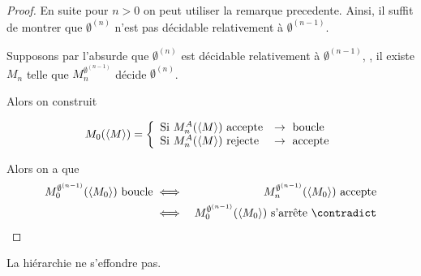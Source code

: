 \begin{proof}
	En suite pour $n > 0$ on peut utiliser la remarque precedente. Ainsi, il suffit de montrer que $\emptyset^{(n)}$ n'est pas décidable relativement à $\emptyset^{(n-1)}$.

	Supposons par l'absurde que $\emptyset^{(n)}$ est décidable relativement à $\emptyset^{(n-1)}$, \ie, il existe $M_n$ telle que $M_n^{\emptyset^{(n-1)}}$ décide $\emptyset^{(n)}$.

	Alors on construit

	$$
		M_0(\left\langle M\right\rangle) =
		\left\{
		\begin{array}{ll}
			\text{Si } M_n^A(\left\langle M\right\rangle) \text{ accepte} & \rightarrow \text{ boucle}  \\
			\text{Si } M_n^A(\left\langle M\right\rangle) \text{ rejecte} & \rightarrow \text{ accepte} \\
		\end{array}
		\right.
	$$

	Alors on a que
	\begin{eqnarray*}
		M_0^{\emptyset^{(n-1)}}(\encode{M_0}) \text{ boucle} &\iff& M_n^{\emptyset^{(n-1)}} (\encode {M_0}) \text{ accepte} \\
		&\iff& M_0^{\emptyset^{(n-1)}}(\encode{M_0}) \text{ s'arrête} \ \contradict
	\end{eqnarray*}
\end{proof}


\begin{coro}
	La hiérarchie ne s'effondre pas.
\end{coro}

